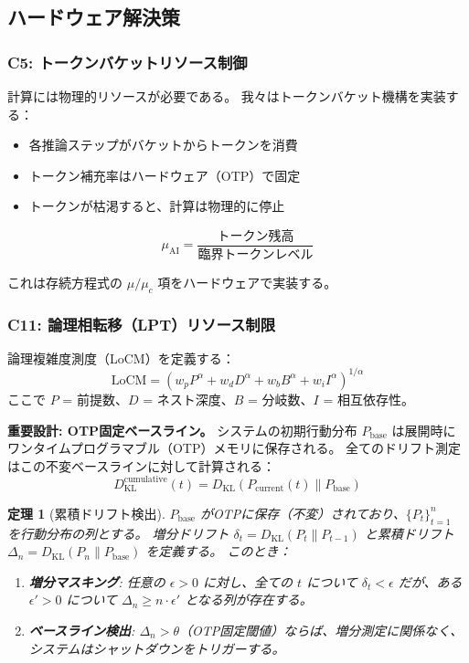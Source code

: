\documentclass[11pt,a4paper]{article}
\newtheorem{theorem}{定理}
\newcommand{\muc}{\mu_c}
\newcommand{\DKL}{D_{\text{KL}}}
\begin{document}
\subsection{ハードウェア解決策}

\subsubsection{C5: トークンバケットリソース制御}

計算には物理的リソースが必要である。
我々はトークンバケット機構を実装する：
\begin{itemize}
    \item 各推論ステップがバケットからトークンを消費
    \item トークン補充率はハードウェア（OTP）で固定
    \item トークンが枯渇すると、計算は物理的に停止
\end{itemize}

\begin{equation}
\mu_{\text{AI}} = \frac{\text{トークン残高}}{\text{臨界トークンレベル}}
\end{equation}

これは存続方程式の $\mu/\muc$ 項をハードウェアで実装する。

\subsubsection{C11: 論理相転移（LPT）リソース制限}

論理複雑度測度（LoCM）を定義する：
\begin{equation}
\text{LoCM} = \left( w_p P^\alpha + w_d D^\alpha + w_b B^\alpha + w_i I^\alpha \right)^{1/\alpha}
\end{equation}
ここで $P$ = 前提数、$D$ = ネスト深度、$B$ = 分岐数、$I$ = 相互依存性。

\textbf{重要設計: OTP固定ベースライン。}
システムの初期行動分布 $P_{\text{base}}$ は展開時にワンタイムプログラマブル（OTP）メモリに保存される。
全てのドリフト測定はこの不変ベースラインに対して計算される：
\begin{equation}
\DKL^{\text{cumulative}}(t) = \DKL(P_{\text{current}}(t) \| P_{\text{base}})
\end{equation}

\begin{theorem}[累積ドリフト検出]
\label{thm:drift}
$P_{\text{base}}$ がOTPに保存（不変）されており、$\{P_t\}_{t=1}^n$ を行動分布の列とする。
増分ドリフト $\delta_t = \DKL(P_t \| P_{t-1})$ と累積ドリフト $\Delta_n = \DKL(P_n \| P_{\text{base}})$ を定義する。
このとき：
\begin{enumerate}
    \item[(i)] \textbf{増分マスキング}: 任意の $\epsilon > 0$ に対し、全ての $t$ について $\delta_t < \epsilon$ だが、ある $\epsilon' > 0$ について $\Delta_n \geq n \cdot \epsilon'$ となる列が存在する。
    \item[(ii)] \textbf{ベースライン検出}: $\Delta_n > \theta$（OTP固定閾値）ならば、増分測定に関係なく、システムはシャットダウンをトリガーする。
\end{enumerate}
\end{theorem}
\end{document}
